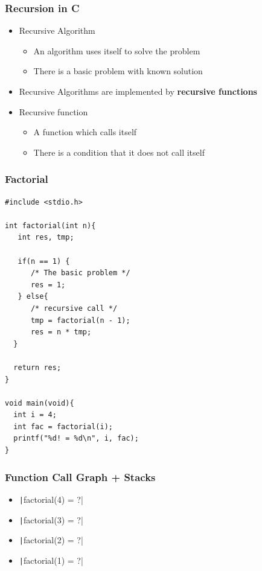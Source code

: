 \documentclass{../c-lecture}
\begin{document}
\begin{frame}
  \frametitle{Recursion in C}
  \begin{itemize}
    \item Recursive Algorithm
    \begin{itemize}
      \item An algorithm uses itself to solve the problem
      \item There is a basic problem with known solution
    \end{itemize}
    \item
      Recursive Algorithms are implemented by
      \textbf{\color{Orange} recursive functions}
    \item Recursive function
    \begin{itemize}
      \item A function which calls itself
      \item There is a condition that it does not call itself
    \end{itemize}
  \end{itemize}
\end{frame}

\begin{frame}[fragile]
  \frametitle{Factorial}
  \scriptsize
  \begin{verbatim}
#include <stdio.h>

int factorial(int n){
   int res, tmp;

   if(n == 1) {
      /* The basic problem */
      res = 1;
   } else{
      /* recursive call */
      tmp = factorial(n - 1);
      res = n * tmp;
  }

  return res;
}

void main(void){
  int i = 4;
  int fac = factorial(i);
  printf("%d! = %d\n", i, fac);
}
  \end{verbatim}
\end{frame}

\begin{frame}[fragile]
  \frametitle{Function Call Graph + Stacks}
  \begin{itemize}
    \item \texttt|factorial(4) = ?|
    \item \texttt|factorial(3) = ?|
    \item \texttt|factorial(2) = ?|
    \item \texttt|factorial(1) = ?|
  \end{itemize}
\end{frame}
\end{document}
